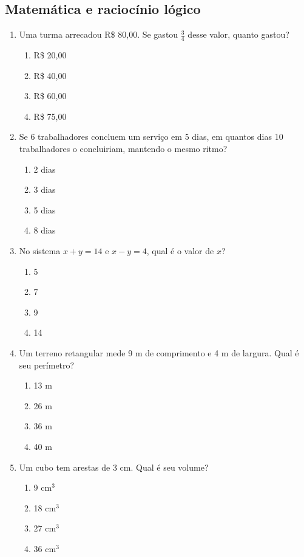 \documentclass[12pt,a4paper]{article}
\begin{document}
\subsection*{Matemática e raciocínio lógico}
\begin{enumerate}[resume]
  \item Uma turma arrecadou R\$ 80,00. Se gastou $\frac{3}{4}$ desse valor, quanto gastou?
  \begin{enumerate}[label=\alph*)]
    \item R\$ 20,00
    \item R\$ 40,00
    \item R\$ 60,00
    \item R\$ 75,00
  \end{enumerate}

  \item Se 6 trabalhadores concluem um serviço em 5 dias, em quantos dias 10 trabalhadores o concluiriam, mantendo o mesmo ritmo?
  \begin{enumerate}[label=\alph*)]
    \item 2 dias
    \item 3 dias
    \item 5 dias
    \item 8 dias
  \end{enumerate}

  \item No sistema $x+y=14$ e $x-y=4$, qual é o valor de $x$?
  \begin{enumerate}[label=\alph*)]
    \item 5
    \item 7
    \item 9
    \item 14
  \end{enumerate}

  \item Um terreno retangular mede 9 m de comprimento e 4 m de largura. Qual é seu perímetro?
  \begin{enumerate}[label=\alph*)]
    \item 13 m
    \item 26 m
    \item 36 m
    \item 40 m
  \end{enumerate}

  \item Um cubo tem arestas de 3 cm. Qual é seu volume?
  \begin{enumerate}[label=\alph*)]
    \item 9 cm$^3$
    \item 18 cm$^3$
    \item 27 cm$^3$
    \item 36 cm$^3$
  \end{enumerate}
\end{enumerate}
\end{document}
